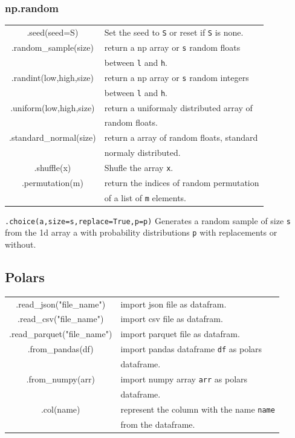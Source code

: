\documentclass[5pt]{article}
\begin{document}
\begin{multicols}{2}
\subsubsection{np.random}
\begin{tabular}{C L}
.seed(seed=S)               & Set the seed to \texttt{S} or reset if \texttt{S} is none.\\
.random\_sample(size)       & return a np array or \texttt{s} random floats\\
                            & between \texttt{l} and \texttt{h}.\\
.randint(low,high,size)     & return a np array or \texttt{s} random integers\\
                            & between \texttt{l} and \texttt{h}.\\
.uniform(low,high,size)     & return a uniformaly distributed array of\\
                            & random floats. \\
.standard\_normal(size)     & return a array of random floats, standard\\
                            & normaly distributed.\\
.shuffle(x)                 & Shufle the array \texttt{x}.\\
.permutation(m)             & return the indices of random permutation\\
                            & of a list of \texttt{m} elements. \\
\end{tabular}
\footnotesize{\texttt{.choice(a,size=s,replace=True,p=p)}  Generates a random sample of size \texttt{s} from the 1d array a with probability distributions \texttt{p} with replacements or without.\\
}

\subsection{Polars}
\begin{tabular}{C L}
.read\_json("file\_name")     &   import json file as datafram.\\
.read\_csv("file\_name")      &   import csv file as datafram.\\
.read\_parquet("file\_name")  &   import parquet file as datafram.\\
.from\_pandas(df)             &   import pandas dataframe \texttt{df} as polars\\
                              &   dataframe.\\
.from\_numpy(arr)             &   import numpy array \texttt{arr} as polars\\
                              &   dataframe.\\
.col(name)                    &   represent the column with the name \texttt{name}\\
                              &    from the dataframe.\\
\end{tabular}


\end{multicols}
\end{document}
